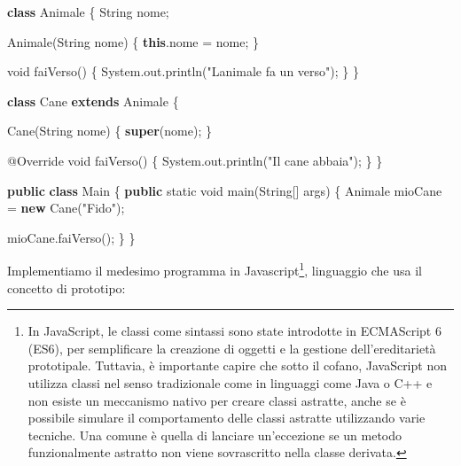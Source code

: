 \documentclass[
  letterpaper,
]{scrbook}
\newenvironment{Shaded}{\begin{snugshade}}{\end{snugshade}}
\newcommand{\AttributeTok}[1]{\textcolor[rgb]{0.40,0.45,0.13}{#1}}
\newcommand{\BuiltInTok}[1]{\textcolor[rgb]{0.00,0.23,0.31}{#1}}
\newcommand{\DataTypeTok}[1]{\textcolor[rgb]{0.68,0.00,0.00}{#1}}
\newcommand{\FunctionTok}[1]{\textcolor[rgb]{0.28,0.35,0.67}{#1}}
\newcommand{\KeywordTok}[1]{\textcolor[rgb]{0.00,0.23,0.31}{\textbf{#1}}}
\newcommand{\NormalTok}[1]{\textcolor[rgb]{0.00,0.23,0.31}{#1}}
\newcommand{\OperatorTok}[1]{\textcolor[rgb]{0.37,0.37,0.37}{#1}}
\newcommand{\StringTok}[1]{\textcolor[rgb]{0.13,0.47,0.30}{#1}}
\begin{document}
\begin{Shaded}
\begin{Highlighting}[]
\KeywordTok{class}\NormalTok{ Animale }\OperatorTok{\{} 
    \BuiltInTok{String}\NormalTok{ nome}\OperatorTok{;}

    \FunctionTok{Animale}\OperatorTok{(}\BuiltInTok{String}\NormalTok{ nome}\OperatorTok{)} \OperatorTok{\{}
        \KeywordTok{this}\OperatorTok{.}\FunctionTok{nome} \OperatorTok{=}\NormalTok{ nome}\OperatorTok{;}
    \OperatorTok{\}}

    \DataTypeTok{void} \FunctionTok{faiVerso}\OperatorTok{()} \OperatorTok{\{}
        \BuiltInTok{System}\OperatorTok{.}\FunctionTok{out}\OperatorTok{.}\FunctionTok{println}\OperatorTok{(}\StringTok{"L\textquotesingle{}animale fa un verso"}\OperatorTok{);}
    \OperatorTok{\}}
\OperatorTok{\}}

\KeywordTok{class}\NormalTok{ Cane }\KeywordTok{extends}\NormalTok{ Animale }\OperatorTok{\{} 

    \FunctionTok{Cane}\OperatorTok{(}\BuiltInTok{String}\NormalTok{ nome}\OperatorTok{)} \OperatorTok{\{}
        \KeywordTok{super}\OperatorTok{(}\NormalTok{nome}\OperatorTok{);}
    \OperatorTok{\}}

    \AttributeTok{@Override}
    \DataTypeTok{void} \FunctionTok{faiVerso}\OperatorTok{()} \OperatorTok{\{}
        \BuiltInTok{System}\OperatorTok{.}\FunctionTok{out}\OperatorTok{.}\FunctionTok{println}\OperatorTok{(}\StringTok{"Il cane abbaia"}\OperatorTok{);}
    \OperatorTok{\}}
\OperatorTok{\}}

\KeywordTok{public} \KeywordTok{class}\NormalTok{ Main }\OperatorTok{\{}
    \KeywordTok{public} \DataTypeTok{static} \DataTypeTok{void} \FunctionTok{main}\OperatorTok{(}\BuiltInTok{String}\OperatorTok{[]}\NormalTok{ args}\OperatorTok{)} \OperatorTok{\{}
\NormalTok{        Animale mioCane }\OperatorTok{=} \KeywordTok{new} \FunctionTok{Cane}\OperatorTok{(}\StringTok{"Fido"}\OperatorTok{);}

\NormalTok{        mioCane}\OperatorTok{.}\FunctionTok{faiVerso}\OperatorTok{();} 
    \OperatorTok{\}}
\OperatorTok{\}}
\end{Highlighting}
\end{Shaded}

Implementiamo il medesimo programma in Javascript\footnote{In
  JavaScript, le classi come sintassi sono state introdotte in
  ECMAScript 6 (ES6), per semplificare la creazione di oggetti e la
  gestione dell'ereditarietà prototipale. Tuttavia, è importante capire
  che sotto il cofano, JavaScript non utilizza classi nel senso
  tradizionale come in linguaggi come Java o C++ e non esiste un
  meccanismo nativo per creare classi astratte, anche se è possibile
  simulare il comportamento delle classi astratte utilizzando varie
  tecniche. Una comune è quella di lanciare un'eccezione se un metodo
  funzionalmente astratto non viene sovrascritto nella classe derivata.},
linguaggio che usa il concetto di prototipo:
\end{document}

